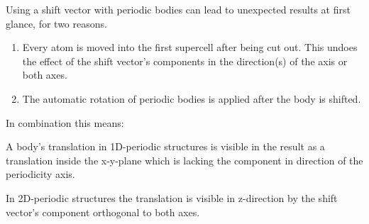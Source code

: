 Using a shift vector with periodic bodies can lead to unexpected results at first glance, for two reasons. 
\begin{enumerate}
 \item Every atom is moved into the first supercell after being cut out. This undoes the effect of the shift vector's components in the direction(s) of the axis or both axes.
 \item The automatic rotation of periodic bodies is applied after the body is shifted.
\end{enumerate}
In combination this means: 

A body's translation in 1D-periodic structures is visible in the result as a translation inside the x-y-plane which is lacking the component in direction of the periodicity axis.

In 2D-periodic structures the translation is visible in z-direction by the shift vector's component orthogonal to both axes.
